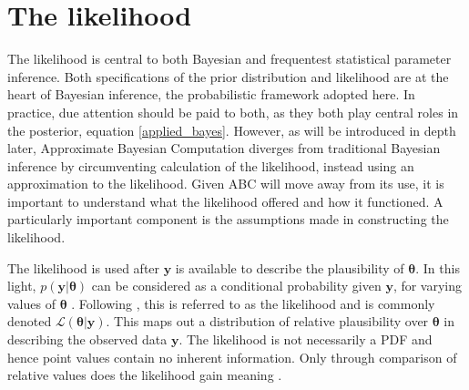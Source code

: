 \section{The likelihood}

The likelihood is central to both Bayesian and frequentest statistical parameter inference. Both specifications of the prior distribution and likelihood are at the heart of Bayesian inference, the probabilistic framework adopted here. In practice, due attention should be paid to both, as they both play central roles in the posterior, equation \ref{applied_bayes}. However, as will be introduced in depth later, Approximate Bayesian Computation diverges from traditional Bayesian inference by circumventing calculation of the likelihood, instead using an approximation to the likelihood. Given ABC will move away from its use, it is important to understand what the likelihood offered and how it functioned. A particularly important component is the assumptions made in constructing the likelihood. \par

The likelihood is used after $\bm{y}$ is available to describe the plausibility of $\bm{\theta}$. In this light, $p(\bm{y}|\bm{\theta})$ can be considered as a conditional probability given $\bm{y}$, for varying values of $\bm{\theta}$ \citep[p.10]{Box1973}. Following \citet{Fisher1922}, this is referred to as the likelihood and is commonly denoted $\mathcal{L}(\bm{\theta}|\bm{y})$. This maps out a distribution of relative plausibility over $\bm{\theta}$ in describing the observed data $\bm{y}$. The likelihood is not necessarily a PDF and hence point values contain no inherent information. Only through comparison of relative values does the likelihood gain meaning \citep[p.11]{Box1973}.\par


